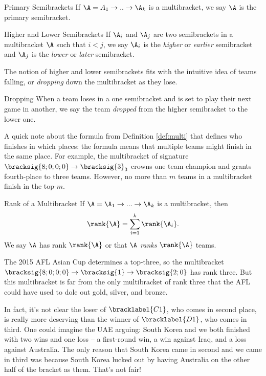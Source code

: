 {    \begin{definition}{Primary Semibrackets}{}
        If $\A = A_1 \to .. \to \A_k$ is a multibracket, we say $\A$ is the primary semibracket.
    \end{definition}

    \begin{definition}{Higher and Lower Semibrackets}{}
        If $\A_i$ and $\A_j$ are two semibrackets in a multibracket $\A$ such that $i < j$, we say $\A_i$ is the \textit{higher} or \textit{earlier} semibracket and $\A_j$ is the \textit{lower} or \textit{later} semibracket.
    \end{definition}

    The notion of higher and lower semibrackets fits with the intuitive idea of teams falling, or \textit{dropping} down the multibracket as they lose.
    
    \begin{definition}{Dropping}{}
        When a team loses in a one semibracket and is set to play their next game in another, we say the team \textit{dropped} from the higher semibracket to the lower one.
    \end{definition}

    A quick note about the formula from Definition \ref{def:multi} that defines who finishes in which places: the formula means that multiple teams might finish in the same place. For example, the multibracket of signature $\bracksig{8;0;0;0} \to \bracksig{3}_3$ crowns one team champion and grants fourth-place to three teams. However, no more than $m$ teams in a multibracket finish in the top-$m$.

    \begin{definition}{Rank of a Multibracket}{}
        If $\A = \A_1 \to ... \to \A_k$ is a multibracket, then $$\rank{\A} = \sum_{i=1}^k \rank{\A_i}.$$ We say $\A$ has rank $\rank{\A}$ or that $\A$ \textit{ranks} $\rank{\A}$ teams.
    \end{definition}

    The 2015 AFL Asian Cup determines a top-three, so the multibracket $\bracksig{8;0;0;0} \to \bracksig{1} \to \bracksig{2;0}$ has rank three. But this multibracket is far from the only multibracket of rank three that the AFL could have used to dole out gold, silver, and bronze.
    
    In fact, it's not clear the loser of $\bracklabel{C1}$, who comes in second place, is really more deserving than the winner of $\bracklabel{D1}$, who comes in third. One could imagine the UAE arguing: South Korea and we both finished with two wins and one loss -- a first-round win, a win against Iraq, and a loss against Australia. The only reason that South Korea came in second and we came in third was because South Korea lucked out by having Australia on the other half of the bracket as them. That's not fair!

}
